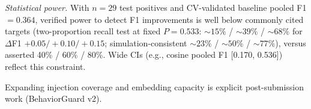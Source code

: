 \emph{Statistical power.}
With $n{=}29$ test positives and CV-validated baseline pooled F1 $=0.364$,
verified power to detect F1 improvements is well below commonly cited targets
(two-proportion recall test at fixed $P{=}0.533$: ${\sim}15\%$ / ${\sim}39\%$ /
${\sim}68\%$ for $\Delta$F1 $+0.05/+0.10/+0.15$; simulation-consistent
${\sim}23\%$ / ${\sim}50\%$ / ${\sim}77\%$), versus asserted 40\% / 60\% / 80\%.
Wide CIs (e.g., cosine pooled F1 [0.170, 0.536]) reflect this constraint.

Expanding injection coverage and embedding capacity is explicit
post-submission work (BehaviorGuard v2).
